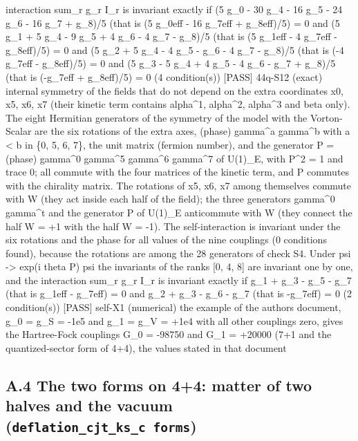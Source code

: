 \documentclass[
  10pt,
]{article}
\newenvironment{Shaded}{}{}
\newcommand{\NormalTok}[1]{#1}
\begin{document}
\begin{Shaded}
\begin{Highlighting}[]
\NormalTok{interaction sum\_r g\_r I\_r is invariant exactly if (5 g\_0 {-} 30 g\_4 {-} 16 g\_5 {-} 24 g\_6 {-} 16 g\_7 + g\_8)/5 (that is (5 g\_0eff {-} 16 g\_7eff + g\_8eff)/5) = 0 and (5 g\_1 + 5 g\_4 {-} 9 g\_5 + 4 g\_6 {-} 4 g\_7 {-} g\_8)/5 (that is (5 g\_1eff {-} 4 g\_7eff {-} g\_8eff)/5) = 0 and (5 g\_2 + 5 g\_4 {-} 4 g\_5 {-} g\_6 {-} 4 g\_7 {-} g\_8)/5 (that is ({-}4 g\_7eff {-} g\_8eff)/5) = 0 and (5 g\_3 {-} 5 g\_4 + 4 g\_5 {-} 4 g\_6 {-} g\_7 + g\_8)/5 (that is ({-}g\_7eff + g\_8eff)/5) = 0 (4 condition(s))}
\NormalTok{[PASS] 44q{-}S12  (exact) internal symmetry of the fields that do not depend on the extra coordinates x0, x5, x6, x7 (their kinetic term contains alpha\^{}1, alpha\^{}2, alpha\^{}3 and beta only). The eight Hermitian generators of the symmetry of the model with the Vorton{-}Scalar are the six rotations of the extra axes, (phase) gamma\^{}a gamma\^{}b with a \textless{} b in \{0, 5, 6, 7\}, the unit matrix (fermion number), and the generator P = (phase) gamma\^{}0 gamma\^{}5 gamma\^{}6 gamma\^{}7 of U(1)\_E, with P\^{}2 = 1 and trace 0; all commute with the four matrices of the kinetic term, and P commutes with the chirality matrix. The rotations of x5, x6, x7 among themselves commute with W (they act inside each half of the field); the three generators gamma\^{}0 gamma\^{}t and the generator P of U(1)\_E anticommute with W (they connect the half W = +1 with the half W = {-}1). The self{-}interaction is invariant under the six rotations and the phase for all values of the nine couplings (0 conditions found), because the rotations are among the 28 generators of check S4. Under psi {-}\textgreater{} exp(i theta P) psi the invariants of the ranks [0, 4, 8] are invariant one by one, and the interaction sum\_r g\_r I\_r is invariant exactly if g\_1 + g\_3 {-} g\_5 {-} g\_7 (that is g\_1eff {-} g\_7eff) = 0 and g\_2 + g\_3 {-} g\_6 {-} g\_7 (that is {-}g\_7eff) = 0 (2 condition(s))}
\NormalTok{[PASS] self{-}X1  (numerical) the example of the author\textquotesingle{}s document, g\_0 = g\_S = {-}1e5 and g\_1 = g\_V = +1e4 with all other couplings zero, gives the Hartree{-}Fock couplings G\_0 = {-}98750 and G\_1 = +20000 (7+1 and the quantized{-}sector form of 4+4), the values stated in that document}
\end{Highlighting}
\end{Shaded}

\hypertarget{a.4-the-two-forms-on-44-matter-of-two-halves-and-the-vacuum-deflation_cjt_ks_c-forms}{%
\subsection{\texorpdfstring{A.4 The two forms on 4+4: matter of two
halves and the vacuum
(\texttt{deflation\_cjt\_ks\_c\ forms})}{A.4 The two forms on 4+4: matter of two halves and the vacuum (deflation\_cjt\_ks\_c forms)}}\label{a.4-the-two-forms-on-44-matter-of-two-halves-and-the-vacuum-deflation_cjt_ks_c-forms}}
\end{document}
